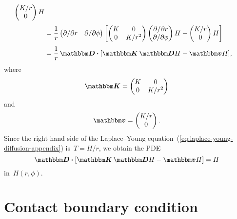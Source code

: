 \begin{align*}
{\begin{pmatrix}
        K / r \\
        0
      \end{pmatrix}
      H
    }
    \\[\tallspace]
  &=
    \frac{1}{r}
    \begin{pmatrix}
      \pd / {\pd r} & \pd / {\pd\phi}
    \end{pmatrix}
    \squarebr*{
      \begin{pmatrix}
        K  &  0 \\
        0  &  K / r^2
      \end{pmatrix}
      \begin{pmatrix}
        \pd / {\pd r} \\
        \pd / {\pd\phi}
      \end{pmatrix}
      H
        -
      \begin{pmatrix}
        K / r \\
        0
      \end{pmatrix}
      H
    }
    \\[\tallspace]
  &=
    \frac{1}{r}
    \matder \dotp \squarebr[\bulkysize]{\mat{K} \matder H - \mat{v} H},
\end{align*}
where
\begin{equation}
  \mat{K} =
    \begin{pmatrix}
      K  &  0 \\
      0  &  K / r^2
    \end{pmatrix}
  \label{eq:small-formally-rectangular-diffusion-coefficient-singular}
\end{equation}
and
\begin{equation}
  \mat{v} =
    \begin{pmatrix}
      K / r \\
      0
    \end{pmatrix}.
    \label{eq:small-formally-rectangular-convection-coefficient-singular}
\end{equation}
Since the right hand side
of the Laplace--Young equation~(\ref{eq:laplace-young-diffusion-appendix})
is~$T = H / r$,
we obtain the PDE
\begin{equation}
  \saveequation{
    \matder \dotp \squarebr[\bulkysize]{\mat{K} \matder H - \mat{v} H}
  }{=}{
    H
  }{eq:small-formally-rectangular-laplace-young-appendix}
\end{equation}
in~$H (r, \phi)$.

\section{Contact boundary condition}
\label{sec:extraction.boundary}

